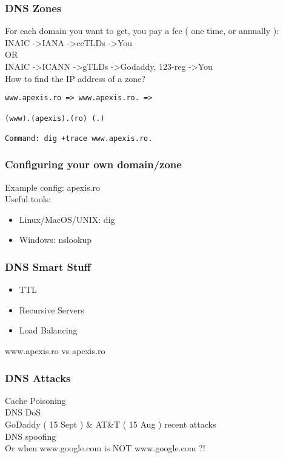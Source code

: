 \documentclass{beamer}
\begin{document}
	
\begin{frame}[fragile]
\frametitle{DNS Zones}
For each domain you want to get, you pay a fee ( one time, or annually ):\\

INAIC -\textgreater IANA -\textgreater ccTLDs -\textgreater You\\ 
OR\\
INAIC -\textgreater ICANN -\textgreater gTLDs -\textgreater Godaddy, 123-reg -\textgreater You\\
\vspace{0.5cm} 
\pause
How to find the IP address of a zone? 
\vspace{0.5cm} 
\begin{verbatim}
www.apexis.ro => www.apexis.ro. => 

(www).(apexis).(ro) (.)

Command: dig +trace www.apexis.ro.

\end{verbatim}

\end{frame}


\begin{frame}
\frametitle{Configuring your own domain/zone}
Example config: apexis.ro\\
\vspace{0.5cm}
Useful tools:\\
\begin{itemize}
  \item Linux/MacOS/UNIX: dig 
  \item Windows: nslookup 
\end{itemize}
\end{frame}


\begin{frame}
\frametitle{DNS Smart Stuff}
\begin{itemize}
  \item TTL
  \item Recursive Servers
  \item Load Balancing
\end{itemize}
\vspace{0.5cm}

www.apexis.ro vs apexis.ro

\end{frame}


\begin{frame}
\frametitle{DNS Attacks}
Cache Poisoning\\
\vspace{0.5cm}
DNS DoS\\ 
\pause
GoDaddy ( 15 Sept ) \& AT\&T ( 15 Aug ) recent attacks\\
\vspace{0.5cm}
DNS spoofing\\
Or when www.google.com is NOT www.google.com ?!
\end{frame}
\end{document}
